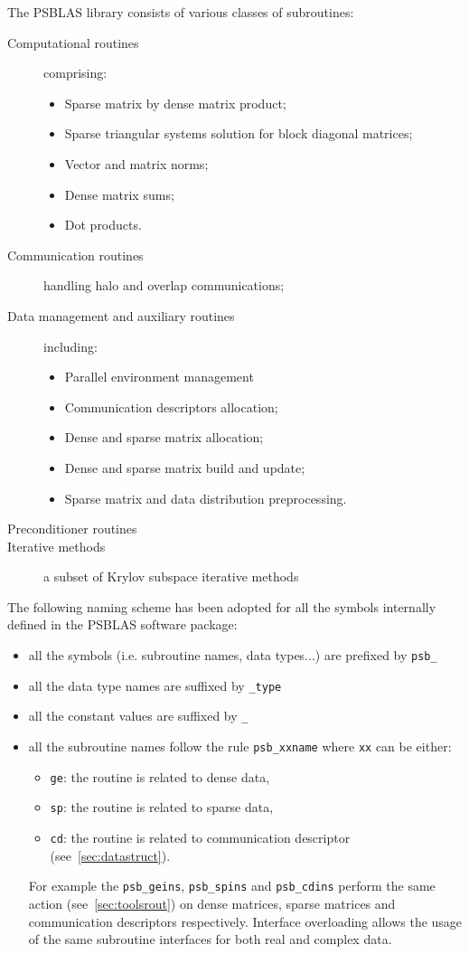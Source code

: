The PSBLAS library consists of various classes of subroutines:
\begin{description}
\item[Computational routines] comprising:
\begin{itemize}
\item Sparse matrix by dense matrix product; 
\item Sparse triangular
systems solution for block diagonal matrices;
\item Vector and matrix norms;
\item Dense matrix sums;
\item Dot products.
\end{itemize} 
\item[Communication routines] handling halo and overlap
  communications;
\item[Data management and auxiliary routines] including:
\begin{itemize}
\item Parallel environment management
\item Communication descriptors allocation;
\item Dense and sparse matrix allocation;
\item Dense and sparse matrix build and update;
\item Sparse matrix and data distribution preprocessing.
\end{itemize} 
\item[Preconditioner routines]
\item[Iterative methods] a subset of Krylov subspace iterative
  methods
\end{description}
The following naming scheme has been adopted for all the symbols
internally defined in the PSBLAS software package:
\begin{itemize}
\item all the symbols (i.e. subroutine names, data types...) are
  prefixed by \verb|psb_| 
\item all the data type names are suffixed by \verb|_type|
\item all the constant values are suffixed by \verb|_|
\item all the subroutine names follow the rule \verb|psb_xxname| where
  \verb|xx| can be either:
  \begin{itemize}
  \item \verb|ge|: the routine is related to dense data, 
  \item \verb|sp|: the routine is related to sparse data, 
  \item \verb|cd|: the routine is related to communication descriptor (see~\ref{sec:datastruct}).
  \end{itemize}
  For example the \verb|psb_geins|, \verb|psb_spins| and
  \verb|psb_cdins| perform the same action (see~\ref{sec:toolsrout}) on
  dense matrices, sparse matrices and communication descriptors
  respectively.
  Interface overloading allows the usage of the same subroutine
  interfaces for both real and complex data.
\end{itemize}
